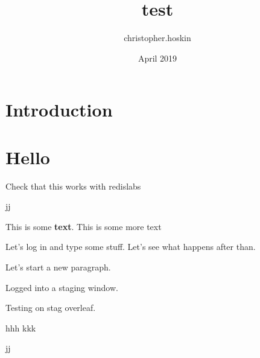 \documentclass{article}
\title{test}
\author{christopher.hoskin }
\date{April 2019}
\begin{document}
\maketitle

\section{Introduction}


\section{Hello}

Check that this works with redislabs

jj

This is some \textbf{text}. This is some more text

Let's log in and type some stuff. Let's see what happens after than.

Let's start a new paragraph.

Logged into a staging window.

Testing on stag overleaf.

hhh
kkk

jj
\end{document}
